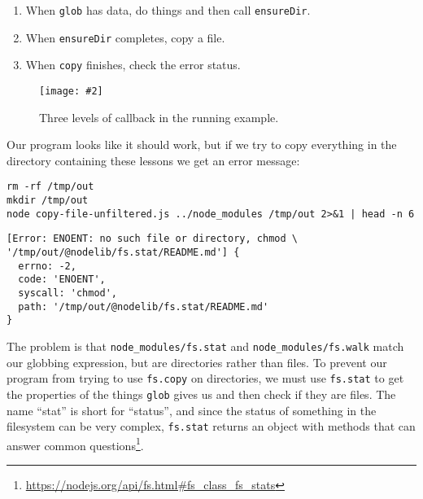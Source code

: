 \documentclass[krantzl]{krantz}
\newcommand{\figpdf}[4]{\begin{figure}%
\centering%
\texttt{[image: \#2]}%
\caption{#3}%
\label{#1}%
\end{figure}}
\newcommand{\hreffoot}[2]{{#1}\footnote{\href{#2}{#2}}}
\begin{document}
\begin{enumerate}

\item 

When \texttt{glob} has data, do things and then call \texttt{ensureDir}.



\item 

When \texttt{ensureDir} completes, copy a file.



\item 

When \texttt{copy} finishes, check the error status.



\end{enumerate}

\figpdf{systems-programming-triple-callback}{./systems-programming/triple-callback.pdf}{Three levels of callback in the running example.}{0.6}


Our program looks like it should work,
but if we try to copy everything in the directory containing these lessons
we get an error message:


\begin{lstlisting}[frame=shadowbox]
rm -rf /tmp/out
mkdir /tmp/out
node copy-file-unfiltered.js ../node_modules /tmp/out 2>&1 | head -n 6
\end{lstlisting}



\begin{lstlisting}[frame=tblr,backgroundcolor=\color{black!5}]
[Error: ENOENT: no such file or directory, chmod \
'/tmp/out/@nodelib/fs.stat/README.md'] {
  errno: -2,
  code: 'ENOENT',
  syscall: 'chmod',
  path: '/tmp/out/@nodelib/fs.stat/README.md'
}
\end{lstlisting}



The problem is that \texttt{node\_modules/fs.stat} and \texttt{node\_modules/fs.walk} match our globbing expression,
but are directories rather than files.
To prevent our program from trying to use \texttt{fs.copy} on directories,
we must use \texttt{fs.stat} to get the properties of the things \texttt{glob} gives us
and then check if they are files.
The name “stat” is short for “status”,
and since the status of something in the filesystem can be very complex,
\texttt{fs.stat}\index{fs.stat} returns \hreffoot{an object with methods that can answer common questions}{https://nodejs.org/api/fs.html\#fs\_class\_fs\_stats}.
\end{document}
